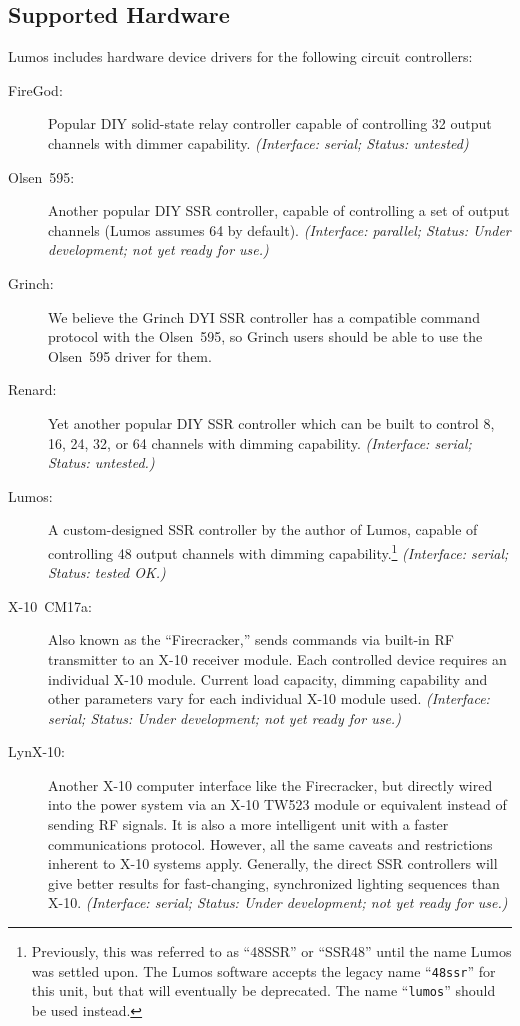 \documentclass{article}
\begin{document}
\subsection{Supported Hardware}
Lumos includes hardware device drivers for the following circuit controllers:
\begin{description}
 \item[FireGod:] Popular DIY solid-state relay controller capable of
  controlling 32 output channels with dimmer capability.
  {\em (Interface: serial; Status: untested)\/}
 \item[Olsen~595:] Another popular DIY SSR controller, capable of controlling
  a set of output channels (Lumos assumes 64 by default).
  {\em (Interface: parallel; Status: Under development; not yet ready for use.)\/}
 \item[Grinch:] We believe the Grinch DYI SSR controller has a compatible
  command protocol with the Olsen~595, so Grinch users should be able to use
  the Olsen~595 driver for them.
 \item[Renard:] Yet another popular DIY SSR controller which can be built
  to control 8, 16, 24, 32, or 64 channels with dimming capability.
  {\em (Interface: serial; Status: untested.)\/}
 \item[Lumos:] A custom-designed SSR controller by the author of Lumos, 
  capable of controlling 48 output channels with dimming capability.\footnote{Previously,
  this was referred to as ``48SSR'' or ``SSR48'' until the name Lumos was settled upon.
  The Lumos software accepts the legacy name ``{\tt 48ssr}'' for this unit, but that
  will eventually be deprecated.  The name ``{\tt lumos}'' should be used instead.}
  {\em (Interface: serial; Status: tested OK.)\/}
 \item[X-10~CM17a:] Also known as the ``Firecracker,'' sends commands via 
  built-in RF transmitter to an X-10 receiver module.  Each controlled device
  requires an individual X-10 module.  Current load capacity, dimming
  capability and other parameters vary for each individual X-10 module used.
  {\em (Interface: serial; Status: Under development; not yet ready for use.)\/}
 \item[LynX-10:] Another X-10 computer interface like the Firecracker, but
  directly wired into the power system via an X-10 TW523 module or equivalent
  instead of sending RF signals.  It is also a more intelligent unit with a
  faster communications protocol.  However, all the same caveats and
  restrictions inherent to X-10 systems apply.  Generally, the direct SSR
  controllers will give better results for fast-changing, synchronized
  lighting sequences than X-10.
  {\em (Interface: serial; Status: Under development; not yet ready for use.)\/}
\end{description}
\end{document}
